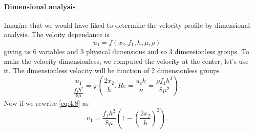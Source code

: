 		\paragraph{Dimensional analysis}
		Imagine that we would have liked to determine the velocity profile by dimensional analysis. The veloity dependance is 
		\begin{equation}
			u_1 = f(x_2, f_1, h, \mu ,\rho )
		\end{equation}
		giving us 6 variables and 3 physical dimensions and so 3 dimensionless groups.   To make the velocity dimensionless, we computed the velocity at the center, let's use it. The dimensionless velocity will be function of 2 dimensionless groups 
		\begin{equation}
			\frac{u_1}{\frac{f_1h^2}{8\mu}} = \varphi \left( \frac{2x_2}{h}, Re = \frac{u_c h}{\nu} = \frac{\rho f_1 h^3}{8 \mu ^2} \right).			
		\end{equation}		 
		Now if we rewrite \eqref{eq:4.8} as 
		\begin{equation}
			u_1 = \frac{f_1h^2}{8\mu}\left( 1 - \left( \frac{2x_2}{h}\right) ^2\right).
		\end{equation}
		
